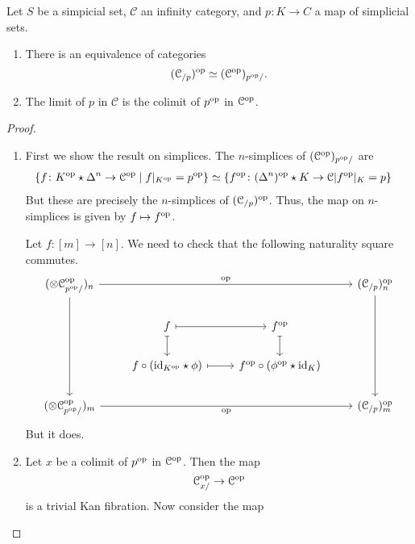 \documentclass[main.tex]{subfiles}
\begin{document}
\begin{theorem}
  \label{thm:initial_terminal_in_infty_cats_unique_up_to_contractible_choice}
  Let $S$ be a simpicial set, $\mathcal{C}$ an infinity category, and $p\colon K \to C$ a map of simplicial sets.
  \begin{enumerate}
    \item There is an equivalence of categories
      \begin{equation*}
        (\mathcal{C}_{/p})^{\mathrm{op}} \simeq (\mathcal{C}^{\mathrm{op}})_{p^{\mathrm{op}}/}.
      \end{equation*}

    \item The limit of $p$ in $\mathcal{C}$ is the colimit of $p^{\mathrm{op}}$ in $\mathcal{C}^{\mathrm{op}}$.
  \end{enumerate}
\end{theorem}
\begin{proof}
  \leavevmode
  \begin{enumerate}
    \item First we show the result on simplices. The $n$-simplices of $(\mathcal{C}^{\mathrm{op}})_{p^{\mathrm{op}}/}$ are
      \begin{align*}
        \{ f\colon K^{\mathrm{op}} \star \Delta^{n} \to \mathcal{C}^{\mathrm{op}} \mid f|_{K^{\mathrm{op}}} = p^{\mathrm{op}} \} &\simeq \{ f^{\mathrm{op}}\colon (\Delta^{n})^{\mathrm{op}} \star K \to \mathcal{C} | f^{\mathrm{op}}|_{K} = p \}
      \end{align*}
      But these are precisely the $n$-simplices of $(\mathcal{C}_{/p})^{\mathrm{op}}$. Thus, the map on $n$-simplices is given by $f \mapsto f^{\mathrm{op}}$.

      Let $f\colon [m] \to [n]$. We need to check that the following naturality square commutes.
      \begin{equation*}
        \begin{tikzcd}
          (\otimes{\mathcal{C}}{^{\mathrm{op}}_{p\op/}})_{n}
          \arrow[rrr, "\mathrm{op}"]
          \arrow[ddd]
          &&& (\mathcal{C}_{/p})_{n}\op
          \arrow[ddd]
          \\
          & f
          \arrow[r, mapsto]
          \arrow[d, mapsto]
          & f\op
          \arrow[d, mapsto]
          \\
          & f \circ(\id_{K\op} \star \phi)
          \arrow[r, mapsto]
          & f\op \circ (\phi\op \star \id_{K})
          \\
          (\otimes{\mathcal{C}}{^{\mathrm{op}}_{p\op/}})_{m}
          \arrow[rrr, swap, "\mathrm{op}"]
          &&& (\mathcal{C}_{/p})_{m}\op
        \end{tikzcd}
      \end{equation*}
      But it does.

    \item Let $x$ be a colimit of $p^{\mathrm{op}}$ in $\mathcal{C}^{\mathrm{op}}$. Then the map
      \begin{equation*}
        \mathcal{C}_{x/}^{\mathrm{op}} \to \mathcal{C}^{\mathrm{op}}
      \end{equation*}
      is a trivial Kan fibration. Now consider the map
  \end{enumerate}
\end{proof}
\end{document}
